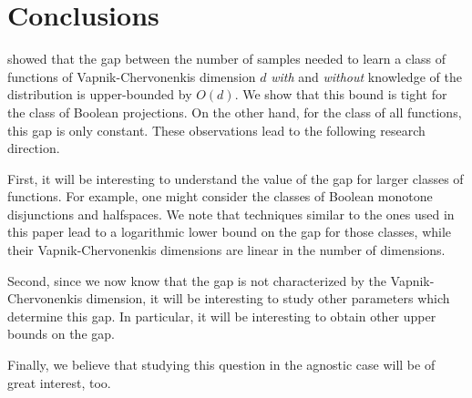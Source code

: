 \section*{Conclusions}
\citet{Darnstadt-Simon-Szorenyi-2013} showed that the gap between the number of samples needed to learn a class of functions of Vapnik-Chervonenkis dimension $d$ \emph{with} and \emph{without} knowledge of the distribution is upper-bounded by $O(d)$. We show that this bound is tight for the class of Boolean projections. On the other hand, for the class of all functions, this gap is only constant. These observations lead to the following research direction. 

First, it will be interesting to understand the value of the gap for larger classes of functions. For example, one might consider the classes of Boolean monotone disjunctions and halfspaces. We note that techniques similar to the ones used in this paper lead to a logarithmic lower bound on the gap for those classes, while their Vapnik-Chervonenkis dimensions are linear in the number of dimensions. 

Second, since we now know that the gap is not characterized by the Vapnik-Chervonenkis dimension, it will be interesting to study other parameters which determine this gap. In particular, it will be interesting to obtain other upper bounds on the gap.

Finally, we believe that studying this question in the agnostic case will be of great interest, too.
